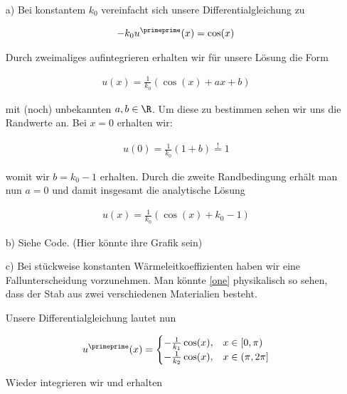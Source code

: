 \begin{solution}
  \begin{itemize}
    \item[a)] Bei konstantem $k_0$ vereinfacht sich unsere Differentialgleichung zu

    \begin{align*}
      -k_0 u ^\primeprime(x) = \cos(x)
    \end{align*}

    Durch zweimaliges aufintegrieren erhalten wir für unsere Lösung die Form

    \begin{align*}
      u(x)
      =
      \frac{1}{k_0}(\cos(x)+ax+b)
    \end{align*}

    mit (noch) unbekannten $a,b \in \R$. Um diese zu bestimmen sehen wir uns die
    Randwerte an. Bei $x=0$ erhalten wir:

    \begin{align*}
      u(0)
      =
      \frac{1}{k_0}(1+b)
      \stackrel{!}{=}
      1
    \end{align*}

    womit wir $b = k_0 -1$ erhalten. Durch die zweite Randbedingung erhält man nun
    $a = 0$ und damit insgesamt die analytische Lösung

    \begin{align*}
      u(x)
      =
      \frac{1}{k_0}(\cos(x)+k_0-1)
    \end{align*}

    \item[b)] Siehe Code. (Hier könnte ihre Grafik sein)

    \item[c)] Bei stückweise konstanten Wärmeleitkoeffizienten haben wir eine
    Fallunterscheidung vorzunehmen. Man könnte \eqref{one} physikalisch so sehen,
    dass der Stab aus zwei verschiedenen Materialien besteht.

    Unsere Differentialgleichung lautet nun

    \begin{align*}
      u^\primeprime(x)
      =
      \begin{cases}
        -\frac{1}{k_1} \cos(x), & x \in [0,\pi) \\
        -\frac{1}{k_2} \cos(x), & x \in (\pi, 2\pi]
      \end{cases}
    \end{align*}

    Wieder integrieren wir und erhalten


\end{itemize}
\end{solution}
